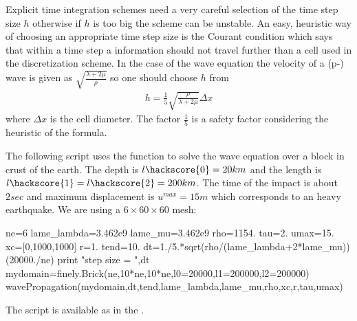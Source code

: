 Explicit time integration schemes need a very careful selection of the time step size $h$ otherwise
if $h$ is too big the scheme can be unstable. An easy, heuristic way of choosing an appropriate
time step size is the Courant condition  
which says that within a time step a information should not travel further than a cell used in the 
discretization scheme. In the case of the wave equation the velocity of a (p-) wave is given as
$\sqrt{\frac{\lambda+2\mu}{\rho}}$ so one should choose $h$ from
\begin{eqnarray}\label{WAVE dyn 66}
h= \frac{1}{5} \sqrt{\frac{\rho}{\lambda+2\mu}} \Delta x
\end{eqnarray}
where $\Delta x$ is the cell diameter. The factor $\frac{1}{5}$ is a safety factor considering the heuristic of 
the formula.

The following script uses the  function to solve the
wave equation over a block in crust of the earth. The
depth is $l\hackscore{0}=20km$ and the length is $l\hackscore{1}=l\hackscore{2}=200km$. 
The time of the impact is about $2sec$ and maximum displacement is $u^{max}=15m$ which corresponds to an heavy 
earthquake. We are using a $6 \times 60 \times 60$ mesh:
\begin{python}
ne=6 
lame_lambda=3.462e9
lame_mu=3.462e9
rho=1154.
tau=2.
umax=15.
xc=[0,1000,1000]
r=1.
tend=10.
dt=1./5.*sqrt(rho/(lame_lambda+2*lame_mu))(20000./ne)
print "step size = ",dt
mydomain=finely.Brick(ne,10*ne,10*ne,l0=20000,l1=200000,l2=200000)
wavePropagation(mydomain,dt,tend,lame_lambda,lame_mu,rho,xc,r,tau,umax)
\end{python}
The script is available as  in the \ExampleDirectory {}.





